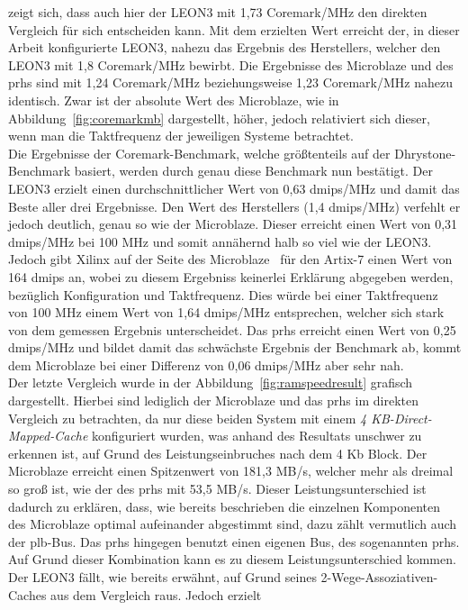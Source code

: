 zeigt sich, dass auch hier der LEON3 mit 1,73 Coremark/MHz den direkten Vergleich für sich entscheiden kann. Mit dem erzielten Wert erreicht der, in dieser Arbeit
konfigurierte LEON3, nahezu das Ergebnis des Herstellers, welcher den LEON3 mit 1,8 Coremark/MHz bewirbt.\cite{leon3} Die Ergebnisse des Microblaze und des \ac{prhs}
sind mit 1,24 Coremark/MHz beziehungsweise 1,23 Coremark/MHz nahezu identisch. Zwar ist der absolute Wert des Microblaze, wie in Abbildung~\ref{fig:coremarkmb} dargestellt,
höher, jedoch relativiert sich dieser, wenn man die Taktfrequenz der jeweiligen Systeme betrachtet. \\
Die Ergebnisse der Coremark-Benchmark, welche größtenteils auf der Dhrystone-Benchmark basiert, werden durch genau diese Benchmark nun bestätigt. Der LEON3 erzielt einen
durchschnittlicher Wert von 0,63 \ac{dmips}/MHz und damit das Beste aller drei Ergebnisse. Den Wert des Herstellers (1,4 \ac{dmips}/MHz) verfehlt er jedoch deutlich,
genau so wie der Microblaze. Dieser erreicht einen Wert von 0,31 \ac{dmips}/MHz bei 100 MHz und somit annähernd halb so viel wie der LEON3. Jedoch gibt Xilinx
auf der Seite des Microblaze~\cite{microblaze} für den Artix-7 einen Wert von 164 \ac{dmips} an, wobei zu diesem Ergebniss keinerlei Erklärung abgegeben werden, bezüglich
Konfiguration und Taktfrequenz. Dies würde bei einer Taktfrequenz von 100 MHz einem Wert von 1,64 \ac{dmips}/MHz entsprechen, welcher sich stark von dem gemessen
Ergebnis unterscheidet. Das \ac{prhs} erreicht einen Wert von 0,25 \ac{dmips}/MHz und bildet damit das schwächste Ergebnis der Benchmark ab, kommt dem Microblaze
bei einer Differenz von 0,06 \ac{dmips}/MHz aber sehr nah.\\
Der letzte Vergleich wurde in der Abbildung~\ref{fig:ramspeedresult} grafisch dargestellt. Hierbei sind lediglich der Microblaze und das \ac{prhs} im direkten Vergleich
zu betrachten, da nur diese beiden System mit einem \emph{4 KB-Direct-Mapped-Cache} konfiguriert wurden, was anhand des Resultats unschwer zu erkennen ist, auf Grund
des Leistungseinbruches nach dem 4 Kb Block. Der Microblaze erreicht einen Spitzenwert von 181,3 MB/s, welcher mehr als dreimal so groß ist, wie der des \ac{prhs}
mit 53,5 MB/s. Dieser Leistungsunterschied ist dadurch zu erklären, dass, wie bereits beschrieben die einzelnen Komponenten des Microblaze optimal aufeinander
abgestimmt sind, dazu zählt vermutlich auch der \ac{plb}-Bus. Das \ac{prhs} hingegen benutzt einen eigenen Bus, des sogenannten \ac{prhs}. Auf Grund dieser Kombination
kann es zu diesem Leistungsunterschied kommen. Der LEON3 fällt, wie bereits erwähnt, auf Grund seines 2-Wege-Assoziativen-Caches aus dem Vergleich raus. Jedoch erzielt
